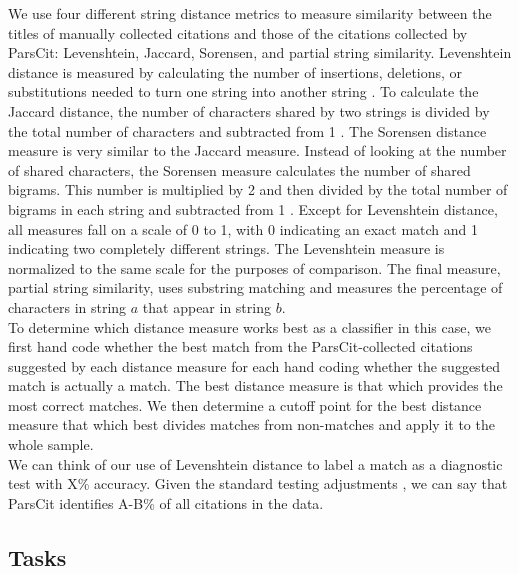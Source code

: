 \documentclass[12pt]{article}
\begin{document}
We use four different string distance metrics to measure similarity between the titles of manually collected citations and those of the citations collected by ParsCit: Levenshtein, Jaccard, Sorensen, and partial string similarity. Levenshtein distance is measured by calculating the number of insertions, deletions, or substitutions needed to turn one string into another string \cite{levenshtein1966}. To calculate the Jaccard distance, the number of characters shared by two strings is divided by the total number of characters and subtracted from 1 \cite{jaccard1901}. The Sorensen distance measure is very similar to the Jaccard measure. Instead of looking at the number of shared characters, the Sorensen measure calculates the number of shared bigrams. This number is multiplied by 2 and then divided by the total number of bigrams in each string and subtracted from 1 \cite{sorensen1948}. Except for Levenshtein distance, all measures fall on a scale of 0 to 1, with 0 indicating an exact match and 1 indicating two completely different strings. The Levenshtein measure is normalized to the same scale for the purposes of comparison. The final measure, partial string similarity, uses substring matching and measures the percentage of characters in string $a$ that appear in string $b$.\\

To determine which distance measure works best as a classifier in this case, we first hand code whether the best match from the ParsCit-collected citations suggested by each distance measure for each hand coding whether the suggested match is actually a match. The best distance measure is that which provides the most correct matches. We then determine a cutoff point for the best distance measure that which best divides matches from non-matches and apply it to the whole sample.\\


We can think of our use of Levenshtein distance to label a match as a diagnostic test with X\% accuracy. Given the standard testing adjustments \cite{pewsner2004}, we can say that ParsCit identifies A-B\% of all citations in the data.


\subsection{Tasks}
\end{document}

